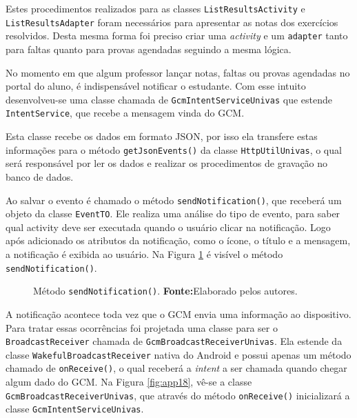 	\par Estes procedimentos realizados para as classes
\texttt{ListResultsActivity} e \texttt{ListResultsAdapter} foram necessários
para apresentar as notas dos exercícios resolvidos. Desta mesma forma foi
preciso criar uma \textit{activity} e um \texttt{adapter} tanto para faltas
quanto para provas agendadas seguindo a mesma lógica.

	\par No momento em que algum professor lançar notas, faltas ou provas agendadas
no portal do aluno, é indispensável notificar o estudante. Com esse intuito
desenvolveu-se uma classe chamada de \texttt{GcmIntentServiceUnivas} que
estende \texttt{IntentService}, que recebe a mensagem vinda do GCM.

	\par Esta classe recebe os dados em formato JSON, por isso ela transfere estas
informações para o método \texttt{getJsonEvents()} da classe
\texttt{HttpUtilUnivas}, o qual será responsável por ler os dados e realizar os
procedimentos de gravação no banco de dados.

	\par Ao salvar o evento é chamado o método \texttt{sendNotification()}, que
receberá um objeto da classe \texttt{EventTO}. Ele realiza uma análise do tipo
de evento, para saber qual activity deve ser executada quando o usuário clicar
na notificação. Logo após adicionado os atributos da notificação, como o ícone,
o título e a mensagem, a notificação é exibida ao usuário. Na Figura
\ref{fig:app17} é visível o método \texttt{sendNotification()}.

	\begin{figure}[h!] 
		\caption[Método sendNotification()]{ Método \texttt{sendNotification()}.
		\textbf{Fonte:}Elaborado pelos autores.}
		\label{fig:app17}
	\end{figure}
	

	\par A notificação acontece toda vez que o GCM envia uma informação ao
dispositivo. Para tratar essas ocorrências foi projetada uma classe para ser o
\texttt{BroadcastReceiver} chamada de \texttt{GcmBroadcastReceiverUnivas}. Ela
estende da classe \texttt{WakefulBroadcastReceiver} nativa do Android e possui
apenas um método chamado de \texttt{onReceive()}, o qual receberá a
\textit{intent} a ser chamada quando chegar algum dado do GCM. Na Figura
\ref{fig:app18}, vê-se a classe \texttt{GcmBroadcastReceiverUnivas}, que
através do método \texttt{onReceive()} inicializará a classe
\texttt{GcmIntentServiceUnivas}.

